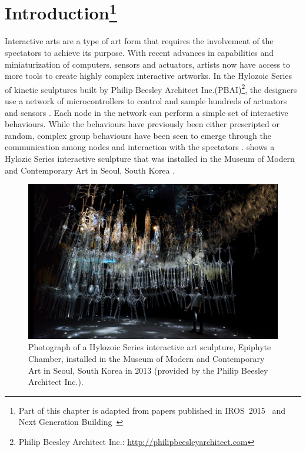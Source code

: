 \chapter[Introduction]{Introduction\footnote{Part of this chapter is adapted from papers published in IROS~2015~\cite{Chan2015} and Next Generation \mbox{Building}~\cite{Gorbet2015}}} 
\label{chap:intro}

Interactive arts are a type of art form that requires the involvement of the spectators to achieve its purpose. With recent advances in capabilities and miniaturization of computers, sensors and actuators, artists now have access to more tools to create highly complex interactive artworks. In the Hylozoic Series of kinetic sculptures built by Philip Beesley Architect Inc.(PBAI)\footnote{Philip Beesley Architect Inc.: \url{http://philipbeesleyarchitect.com}}, the designers use a network of microcontrollers to control and sample hundreds of actuators and sensors \cite{Beesley2010}\cite{Beesley2010-1}. Each node in the network can perform a simple set of interactive behaviours. While the behaviours have previously been either prescripted or random, complex group behaviours have been seen to emerge through the communication among nodes and interaction with the spectators \cite{Beesley2012}.  shows a Hylozic Series interactive sculpture that was installed in the Museum of Modern and Contemporary Art in Seoul, South Korea \cite{PBAISeoul2013}. 

\begin{figure} [!htb]
	\centering
	\includegraphics[width=1.0 \textwidth]{"fig/introduction/PBAI_09"}
	\caption[Photograph of a Hylozoic Series interactive art sculpture, Epiphyte Chamber]{Photograph of a Hylozoic Series interactive art sculpture, Epiphyte Chamber, installed in the Museum of Modern and Contemporary Art in Seoul, South Korea in 2013 (provided by the Philip Beesley Architect Inc.).}
	\label{fig:other-sculpture-photo}
\end{figure}

